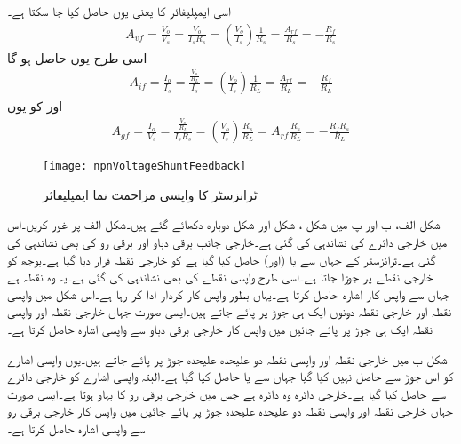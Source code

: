 اسی ایمپلیفائر کا  یعنی  یوں حاصل کیا جا سکتا ہے۔
\begin{align}
A_{vf}=\frac{V_o}{V_s}=\frac{V_o}{I_s R_s}=\left (\frac{V_o}{I_s} \right ) \frac{1}{R_s}=\frac{A_{rf}}{R_s}=-\frac{R_f}{R_s}
\end{align}
اسی طرح  یوں حاصل ہو گا
\begin{align}
A_{if}=\frac{I_o}{I_s}=\frac{\frac{V_o}{R_L}}{I_s}=\left (\frac{V_o}{I_s} \right) \frac{1}{R_L}=\frac{A_{rf}}{R_L}=-\frac{R_f}{R_L}
\end{align}
اور  کو یوں
\begin{align}
A_{gf}=\frac{I_o}{V_s}=\frac{\frac{V_o}{R_L}}{I_s R_s}=\left (\frac{V_o}{I_s} \right) \frac{R_s}{R_L}=A_{rf}\frac{R_s}{R_L}=-\frac{R_f R_s}{R_L}
\end{align}
%
\begin{figure}
\centering
\texttt{[image: npnVoltageShuntFeedback]}
\caption{ٹرانزسٹر کا واپسی مزاحمت نما ایمپلیفائر}
\label{شکل_واپسی_ٹرانزسٹر_مزاحمت_نما_ایمپلیفائر}
\end{figure}
شکل  الف، ب اور پ میں شکل ، شکل  اور شکل  دوبارہ دکھائے گئے ہیں۔شکل  الف پر غور کریں۔اس میں خارجی دائرے کی نشاندہی کی گئی ہے۔خارجی جانب برقی دباو  اور برقی رو  کی بھی نشاندہی کی گئی ہے۔ٹرانزسٹر کے  جہاں سے  یا (اور)  حاصل کیا گیا ہے کو خارجی نقطہ قرار دیا گیا ہے۔بوجھ  کو خارجی نقطے  پر جوڑا جاتا ہے۔اسی طرح واپسی نقطے  کی بھی نشاندہی کی گئی ہے۔یہ وہ نقطہ ہے جہاں سے واپس کار اشارہ حاصل کرتا ہے۔یہاں  بطور واپس کار کردار ادا کر رہا ہے۔اس شکل میں واپسی نقطہ اور خارجی نقطہ دونوں ایک ہی جوڑ پر پائے جاتے ہیں۔ایسی صورت جہاں خارجی نقطہ  اور واپسی نقطہ ایک ہی جوڑ پر پائے جائیں میں واپس کار خارجی برقی دباو  سے واپسی اشارہ حاصل کرتا ہے۔

شکل  ب میں خارجی نقطہ اور واپسی نقطہ دو علیحدہ علیحدہ جوڑ پر پائے جاتے ہیں۔یوں واپسی اشارے کو اس جوڑ سے حاصل نہیں کیا گیا جہاں سے  یا  حاصل کیا گیا ہے۔البتہ واپسی اشارے کو خارجی دائرے سے حاصل کیا گیا ہے۔خارجی دائرہ وہ دائرہ ہے جس میں خارجی برقی رو  کا بہاو ہوتا ہے۔ایسی صورت جہاں خارجی نقطہ  اور واپسی نقطہ دو علیحدہ علیحدہ جوڑ پر پائے جائیں میں واپس کار خارجی برقی رو  سے واپسی اشارہ حاصل کرتا ہے۔

